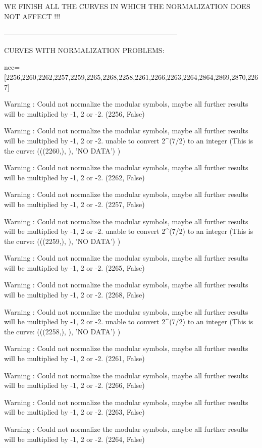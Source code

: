 WE FINISH ALL THE CURVES IN WHICH THE NORMALIZATION DOES NOT AFFECT !!!

--------------------------------------------------------------------------

CURVES WITH NORMALIZATION PROBLEMS:

nec=[2256,2260,2262,2257,2259,2265,2268,2258,2261,2266,2263,2264,2864,2869,2870,2267]

Warning : Could not normalize the modular symbols, maybe all further results will be multiplied by -1, 2 or -2.
(2256, False)

Warning : Could not normalize the modular symbols, maybe all further results will be multiplied by -1, 2 or -2.
unable to convert 2^(7/2) to an integer (This is the curve:  (((2260,), {}), 'NO DATA') )

Warning : Could not normalize the modular symbols, maybe all further results will be multiplied by -1, 2 or -2.
(2262, False)

Warning : Could not normalize the modular symbols, maybe all further results will be multiplied by -1, 2 or -2.
(2257, False)

Warning : Could not normalize the modular symbols, maybe all further results will be multiplied by -1, 2 or -2.
unable to convert 2^(7/2) to an integer  (This is the curve:  (((2259,), {}), 'NO DATA') )

Warning : Could not normalize the modular symbols, maybe all further results will be multiplied by -1, 2 or -2.
(2265, False)

Warning : Could not normalize the modular symbols, maybe all further results will be multiplied by -1, 2 or -2.
(2268, False)

Warning : Could not normalize the modular symbols, maybe all further results will be multiplied by -1, 2 or -2.
unable to convert 2^(7/2) to an integer  (This is the curve:  (((2258,), {}), 'NO DATA') )

Warning : Could not normalize the modular symbols, maybe all further results will be multiplied by -1, 2 or -2.
(2261, False)

Warning : Could not normalize the modular symbols, maybe all further results will be multiplied by -1, 2 or -2.
(2266, False)

Warning : Could not normalize the modular symbols, maybe all further results will be multiplied by -1, 2 or -2.
(2263, False)

Warning : Could not normalize the modular symbols, maybe all further results will be multiplied by -1, 2 or -2.
(2264, False)

